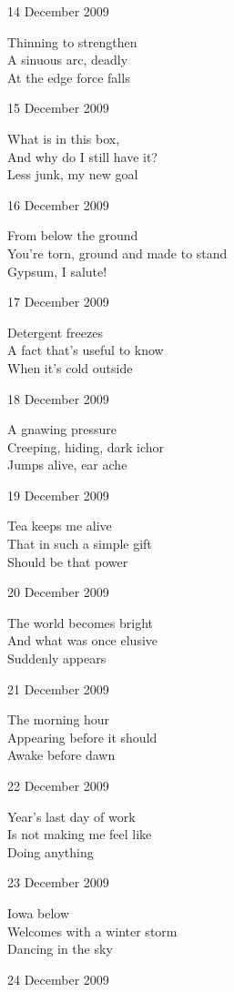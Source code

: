 \documentclass[12pt]{article}
\begin{document}
14 December 2009

Thinning to strengthen \\
A sinuous arc, deadly \\
At the edge force falls

15 December 2009

What is in this box, \\
And why do I still have it? \\
Less junk, my new goal

16 December 2009

From below the ground \\
You're torn, ground and made to stand \\
Gypsum, I salute!

17 December 2009

Detergent freezes \\
A fact that's useful to know \\
When it's cold outside


\newpage

18 December 2009

A gnawing pressure \\
Creeping, hiding, dark ichor \\
Jumps alive, ear ache

19 December 2009

Tea keeps me alive \\
That in such a simple gift \\
Should be that power

20 December 2009

The world becomes bright \\
And what was once elusive \\
Suddenly appears

21 December 2009

The morning hour \\
Appearing before it should \\
Awake before dawn

22 December 2009

Year's last day of work \\
Is not making me feel like \\
Doing anything

23 December 2009

Iowa below \\
Welcomes with a winter storm \\
Dancing in the sky

24 December 2009
\end{document}
